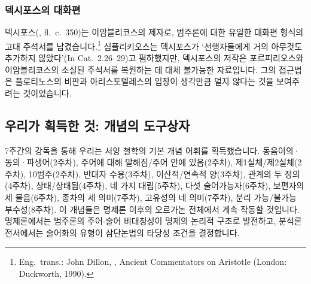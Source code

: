 \documentclass[12pt, a4paper]{article}
\begin{document}
\subsubsection{덱시포스의 대화편}

덱시포스(, fl.\ c.\ 350)는 이암블리코스의 제자로, 범주론에 대한 유일한 대화편 형식의 고대 주석서를 남겼습니다.\footnote{Eng.\ trans.: John Dillon, , Ancient Commentators on Aristotle (London: Duckworth, 1990).} 심플리키오스는 덱시포스가 `선행자들에게 거의 아무것도 추가하지 않았다'(In Cat.\ 2.26--29)고 폄하했지만, 덱시포스의 저작은 포르피리오스와 이암블리코스의 소실된 주석서를 복원하는 데 대체 불가능한 자료입니다. 그의 접근법은 플로티노스의 비판과 아리스토텔레스의 입장이 생각만큼 멀지 않다는 것을 보여주려는 것이었습니다.

\subsection{우리가 획득한 것: 개념의 도구상자}

7주간의 강독을 통해 우리는 서양 철학의 기본 개념 어휘를 획득했습니다. 동음이의·동의·파생어(2주차), 주어에 대해 말해짐/주어 안에 있음(2주차), 제1실체/제2실체(2주차), 10범주(2주차), 반대자 수용(3주차), 이산적/연속적 양(3주차), 관계의 두 정의(4주차), 상태/상태됨(4주차), 네 가지 대립(5주차), 다섯 술어가능자(6주차), 보편자의 세 물음(6주차), 종차의 세 의미(7주차), 고유성의 네 의미(7주차), 분리 가능/불가능 부수성(8주차). 이 개념들은 명제론 이후의 오르가논 전체에서 계속 작동할 것입니다. 명제론에서는 범주론의 주어-술어 비대칭성이 명제의 논리적 구조로 발전하고, 분석론 전서에서는 술어화의 유형이 삼단논법의 타당성 조건을 결정합니다.
\end{document}
